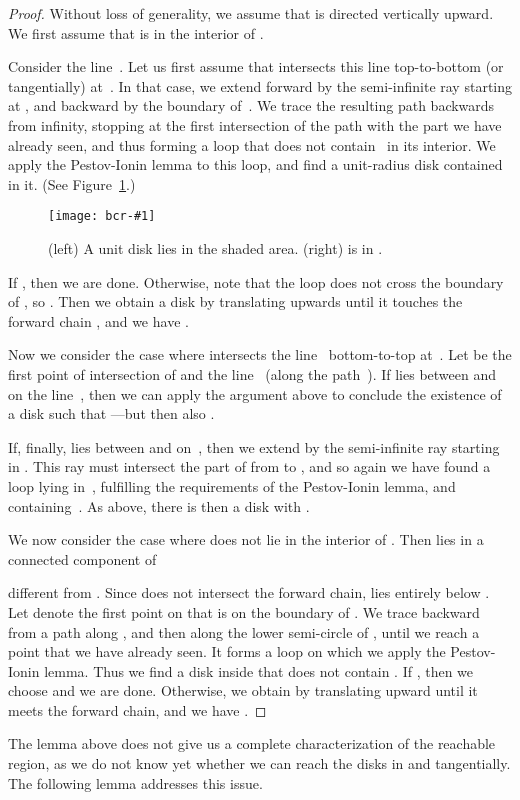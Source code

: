 \documentclass[a4paper]{article}
\newcommand{\epsfigure}[2]{
  \begin{figure}[htb]
    \centerline{\texttt{[image: bcr-\#1]}}
    \caption{#2}
    \label{f:#1}
  \end{figure}}
\begin{document}
\begin{proof}
  Without loss of generality, we assume that  is directed
  vertically upward. We first assume that  is in the
  interior of .
 
  Consider the line~. Let us first assume that  intersects
  this line top-to-bottom (or tangentially) at~. In that case, we
  extend  forward by the semi-infinite ray starting at ,
  and backward by the boundary of~.  We trace the
  resulting path backwards 
  from infinity, stopping at the first intersection of the path with
  the part we have already seen, and thus forming a loop that does not
  contain~ in its interior.  We apply the Pestov-Ionin lemma to
  this loop, and find a unit-radius disk  contained in it. (See
  Figure~\ref{f:proof1}.)
\epsfigure{proof1}{(left) A unit disk  lies in the shaded area.
  (right)  is in .}
If , then we are done. Otherwise, note that the loop
  does not cross the boundary of , so
  . Then we obtain a disk  by translating  upwards until it touches the
  forward chain ,  and we have .

  Now we consider the case where  intersects the line~
  bottom-to-top at~. Let  be the first point of intersection of
   and the line~ (along the path~).  If  lies
  between  and  on the line~, then we can apply the argument
  above to conclude the existence of a disk  such that ---but then also .

  If, finally,  lies between  and  on~, then we extend
   by the semi-infinite ray starting in .  This ray must
  intersect the part of  from  to , and so again we
  have found a loop lying in~, fulfilling the requirements of the
  Pestov-Ionin lemma, and containing~.  As above, there is then a
  disk  with .

  We now consider the case where  does not lie in the interior of 
  .  Then  lies in a connected component  of 
   
  different from . Since  does not intersect the
  forward chain,  lies entirely below . Let  denote the
  first point on  that is on the boundary of . We trace
  backward from  a path along , and then along the lower semi-circle
  of , until we reach a point that we have already seen. It forms
  a loop on which we apply the Pestov-Ionin lemma. Thus we find a
  disk  inside  that does not contain . 
  If  , then we choose  and we are done. 
  Otherwise, we obtain  by translating  upward until it
  meets the forward chain, and we have .
\end{proof}

The lemma above does not give us a complete characterization of the
reachable region, as we do not know yet whether we can reach the disks
in  and  tangentially. The following lemma
addresses this issue.
\end{document}

